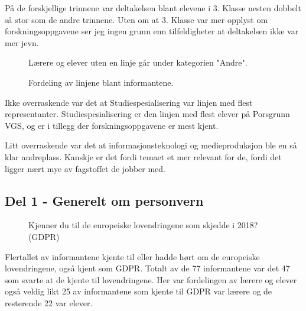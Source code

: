 På de forskjellige trinnene var deltakelsen blant elevene i 3. Klasse nesten dobbelt så stor som de andre trinnene. Uten om at 3. Klasse var mer opplyst om forskningsoppgavene ser jeg ingen grunn enn tilfeldigheter at deltakelsen ikke var mer jevn.

\begin{figure}[H]
    \centering
    Lærere og elever uten en linje går under kategorien "Andre".
    \caption{Fordeling av linjene blant informantene.}
\end{figure}
Ikke overraskende var det at Studiespesialisering var linjen med flest representanter. Studiespesialisering er den linjen med flest elever på Porsgrunn VGS, og er i tillegg der forskningsoppgavene er mest kjent. 

Litt overraskende var det at informasjonsteknologi og medieproduksjon ble en så klar andreplass. Kanskje er det fordi temaet et mer relevant for de, fordi det ligger nært mye av fagstoffet de jobber med.

\subsection{Del 1 - Generelt om personvern}
\begin{figure}[H]
    \centering
    \caption{Kjenner du til de europeiske lovendringene som skjedde i 2018? (GDPR)}
\end{figure}
Flertallet av informantene kjente til eller hadde hørt om de europeiske lovendringene, også kjent som GDPR. Totalt av de 77 informantene var det 47 som svarte at de kjente til lovendringene. Her var fordelingen av lærere og elever også veldig likt 25 av informantene som kjente til GDPR var lærere og de resterende 22 var elever. 

